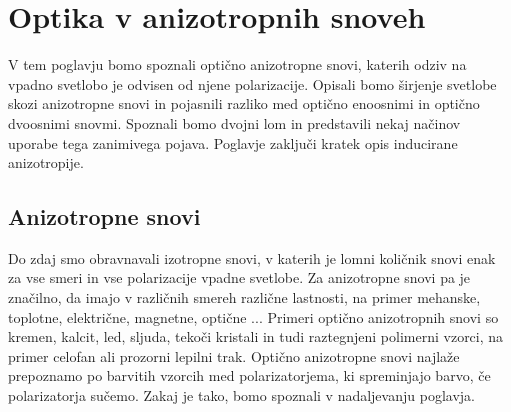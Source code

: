 
\chapter{Optika v anizotropnih snoveh}
\label{chap:AnizotropneSnovi}
V tem poglavju bomo spoznali optično anizotropne snovi, katerih odziv na 
vpadno svetlobo je odvisen od njene polarizacije. Opisali bomo 
širjenje svetlobe skozi anizotropne snovi in pojasnili razliko med optično 
enoosnimi in optično dvoosnimi snovmi. Spoznali bomo dvojni lom in 
predstavili nekaj načinov uporabe tega zanimivega pojava. Poglavje zaključi
kratek opis inducirane anizotropije.

\section{Anizotropne snovi}
\label{chap:AnizoLorentz}
Do zdaj smo obravnavali izotropne snovi, v katerih je lomni količnik 
snovi enak za vse smeri in vse polarizacije vpadne svetlobe. 
Za anizotropne snovi pa je značilno, da imajo 
v različnih smereh različne lastnosti, na primer mehanske, toplotne, 
električne, magnetne, optične ... Primeri optično 
anizotropnih snovi so kremen, kalcit, led, sljuda, tekoči kristali
in tudi raztegnjeni polimerni vzorci, na primer celofan ali prozorni lepilni trak. 
Optično anizotropne snovi najlaže prepoznamo po barvitih vzorcih med
polarizatorjema, ki spreminjajo barvo, če polarizatorja sučemo. 
Zakaj je tako, bomo spoznali v nadaljevanju poglavja.
